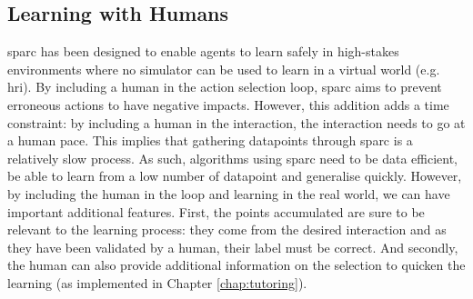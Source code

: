 \subsection{Learning with Humans}



\gls{sparc} has been designed to enable agents to learn safely in high-stakes environments where no simulator can be used to learn in a virtual world (e.g. \gls{hri}). By including a human in the action selection loop, \gls{sparc} aims to prevent erroneous actions to have negative impacts. However, this addition adds a time constraint: by including a human in the interaction, the interaction needs to go at a human pace. This implies that gathering datapoints through \gls{sparc} is a relatively slow process. As such, algorithms using \gls{sparc} need to be data efficient, be able to learn from a low number of datapoint and generalise quickly. However, by including the human in the loop and learning in the real world, we can have important additional features. First, the points accumulated are sure to be relevant to the learning process: they come from the desired interaction and as they have been validated by a human, their label must be correct. And secondly, the human can also provide additional information on the selection to quicken the learning (as implemented in Chapter \ref{chap:tutoring}).

